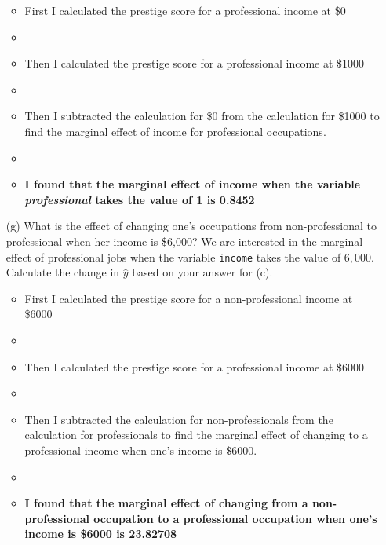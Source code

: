 \documentclass[12pt,letterpaper]{article}
\begin{document}
\begin{enumerate}
\begin{itemize}
	\item First I calculated the prestige score for a professional income at \$0
	\item 
	\item Then I calculated the prestige score for a professional income at \$1000
	\item 
	\item Then I subtracted the calculation for \$0 from the calculation for \$1000 to find the marginal effect of income for professional occupations.
	\item 
	\item \textbf{I found that the marginal effect of income when the variable \textit{professional} takes the value of 1 is 0.8452}
\end{itemize}
	
\newpage
	\item [(g)]
	What is the effect of changing one's occupations from non-professional to professional when her income is \$6,000? We are interested in the marginal effect of professional jobs when the variable \texttt{income} takes the value of $6,000$. Calculate the change in $\hat{y}$ based on your answer for (c).
	

	
\begin{itemize}
		\item First I calculated the prestige score for a non-professional income at \$6000
		\item 
		\item Then I calculated the prestige score for a professional income at \$6000
		\item 
		\item Then I subtracted the calculation for non-professionals from the calculation for professionals to find the marginal effect of changing to a professional income when one's income is \$6000.
		\item 
		\item \textbf{I found that the marginal effect of changing from a non-professional occupation to a professional occupation when one's income is \$6000 is 23.82708}
	
\end{itemize}
	
	
\end{enumerate}
\end{document}
